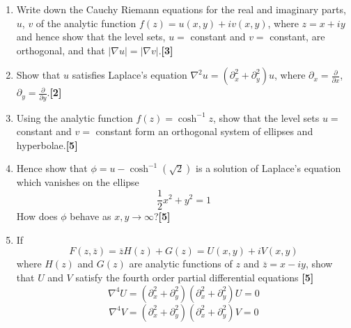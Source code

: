 \documentclass[a4paper]{article}
\begin{document}
\begin{qns}\leavevmode
\begin{enumerate}[label=(\roman*)]
\item Write down the Cauchy Riemann equations for the real and imaginary parts, $u$, $v$ of the analytic function $f(z) = u(x, y)+iv(x, y)$, where $z = x+iy$ and hence show that the level sets, $u =$ constant and $v =$ constant, are orthogonal, and that $|\nabla u| = |\nabla v|$.\hfill \textbf{[3]}
\item Show that $u$ satisfies Laplace’s equation $\nabla^2 u=(\partial_x^2+\partial_y^2)u$, where $\partial_x=\frac{\partial}{\partial x}$, $\partial_y=\frac{\partial}{\partial y}$.\hfill \textbf{[2]}
\item Using the analytic function $f(z) = \cosh^{−1} z$, show that the level sets $u =$ constant and $v =$ constant form an orthogonal system of ellipses and hyperbolae.\hfill \textbf{[5]}
\item Hence show that $\phi=u-\cosh^{-1}(\sqrt{2})$ is a solution of Laplace’s equation which vanishes on the ellipse
$$\frac{1}{2}x^2+y^2=1$$
How does $\phi$ behave as $x,y\rightarrow\infty$?\hfill \textbf{[5]}
\item If $$F(z,\overline{z})=\overline{z}H(z)+G(z)=U(x,y)+iV(x,y)$$
where $H(z)$ and $G(z)$ are analytic functions of $z$ and $\overline{z}=x-iy$, show that $U$ and $V$ satisfy the fourth order partial differential equations \hfill \textbf{[5]}
$$\nabla^4U=(\partial_x^2+\partial_y^2)(\partial_x^2+\partial_y^2)U=0$$
$$\nabla^4V=(\partial_x^2+\partial_y^2)(\partial_x^2+\partial_y^2)V=0$$
\end{enumerate}
\end{qns}
\end{document}
